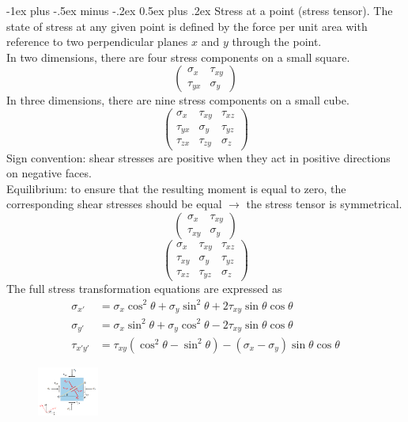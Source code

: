 \documentclass[10pt,landscape,a4paper]{article}
\makeatletter
\renewcommand{\section}{\@startsection{section}{1}{0mm}%
	{-1ex plus -.5ex minus -.2ex}%
	{0.5ex plus .2ex}%
	{\normalfont\large\bfseries}}
\makeatother
\begin{document}
\begin{multicols}{3}
		\section{Stress at a point (stress tensor).}
		The state of stress at any given point is defined by the force per unit area with reference to two perpendicular planes $ x $ and $ y $ through the point.\\
		In two dimensions, there are four stress components on a small square.
		\[
			\begin{pmatrix}
				\sigma_x & \tau_{xy}\\
				\tau_{yx} & \sigma_y
			\end{pmatrix}
		\]
		In three dimensions, there are nine stress components on a small cube.
		\[
			\begin{pmatrix}
				\sigma_x & \tau_{xy} & \tau_{xz}\\
				\tau_{yx} & \sigma_y & \tau_{yz}\\
				\tau_{zx} & \tau_{zy} & \sigma_z
			\end{pmatrix}
		\]
		Sign convention: shear stresses are positive when they act in positive directions on negative faces.\\
		Equilibrium: to ensure that the resulting moment is equal to zero, the corresponding shear stresses should be equal $ \rightarrow $ the stress tensor is symmetrical.
		\[
			\begin{pmatrix}
				\sigma_x & \tau_{xy}\\
				\tau_{xy} & \sigma_y
			\end{pmatrix}
		\]
		\[
		\begin{pmatrix}
			\sigma_x & \tau_{xy} & \tau_{xz}\\
			\tau_{xy} & \sigma_y & \tau_{yz}\\
			\tau_{xz} & \tau_{yz} & \sigma_z
		\end{pmatrix}
		\]
		The full stress transformation equations are expressed as
			\begin{align*}
				\sigma_{x'}&=\sigma_x\cos^2\theta+\sigma_y\sin^2\theta+2\tau_{xy}\sin\theta\cos\theta\\
				\sigma_{y'}&=\sigma_x\sin^2\theta+\sigma_y\cos^2\theta-2\tau_{xy}\sin\theta\cos\theta\\
				\tau_{x'y'}&=\tau_{xy}(\cos^2\theta-\sin^2\theta)-(\sigma_x-\sigma_y)\sin\theta\cos\theta
			\end{align*}
			\begin{figure}[H]
				\centering
				\includegraphics[width=0.18\textwidth]{stress-tensor}

\end{figure}
\end{multicols}
\end{document}
